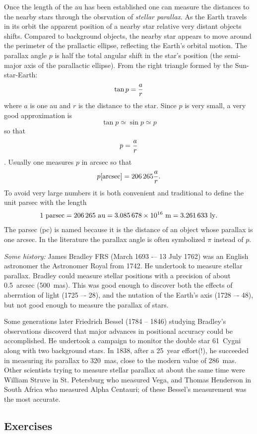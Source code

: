 Once the length of the au has been established one can measure the distances to the nearby stars
through the obsrvation of {\it stellar parallax}. As the Earth travels in its orbit the apparent
position of a nearby star relative very distant objects shifts. Compared to background objects,
the nearby star appears to move around the perimeter of the prallactic ellipse, reflecting the 
Earth's orbital motion. The parallax angle $p$ is half the total angular shift in the star's
position (the semi-major axis of the parallactic ellipse). From the right triangle formed by the
Sun-star-Earth:
\[ \tan p={a\over r} \]
where $a$ is one au and $r$ is the distance to the star. Since $p$ is very small, a very good 
approximation is \[\tan p\simeq\sin p\simeq p\] so that \[ p={a\over r}\]. Usually one measures
$p$ in arcsec so that 
\[ p[{\rm arcsec}]=206\,265{a\over r}. \]
To avoid very large numbers it is both convenient and traditional to define the unit parsec with 
the length
\[ 1~{\rm parsec}=206\,265~{\rm au}=3.085\,678\times 10^{16}~{\rm m}=3.261\,633~{\rm ly}. \]
The parsec (pc) is named because it is the distance of an object whose parallax is one arcsec. 
In the literature the parallax angle is often symbolized $\pi$ instead of $p$.

{\it Some history:} James Bradley FRS (March 1693 -– 13 July 1762) was an English astronomer the Astronomer Royal from 1742. He undertook to measure stellar parallax. Bradley could measure stellar positions with a precision of about 0.5~arcsec (500~mas). This was good enough to
discover both the effects of aberration of light (1725 –- 28), and the nutation of the Earth's axis (1728 –- 48), but not good enough to measure the parallax of stars.

Some generations later Friedrich Bessel (1784 -- 1846) studying Bradley's observations discoverd
that major advances in positional accuracy could be accomplished. He undertook a campaign to
monitor the double star 61~Cygni along with two background stars. In 1838, after a 25~year effort(!), he succeeded in measuring its parallax to 320~mas, close to the modern value of 
286~mas. Other scientists trying to measure stellar parallax at about the same time were
William Struve in St. Petersburg who measured Vega, and Thomas Henderson in South Africa who measured Alpha Centauri; of these Bessel's measurement was the most accurate.

\subsection{Exercises}


